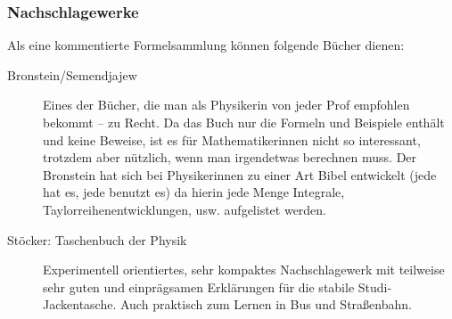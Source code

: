 \subsubsection{Nachschlagewerke}

Als eine kommentierte Formelsammlung können folgende Bücher dienen:

\begin{description}
\item[Bronstein/Semendjajew]{
		Eines der Bücher, die man als Physikerin von jeder Prof empfohlen bekommt -- zu Recht. Da das Buch nur die Formeln und Beispiele enthält und keine Beweise, ist es für Mathematikerinnen nicht so interessant, trotzdem aber nützlich, wenn man irgendetwas berechnen muss. Der Bronstein hat sich bei Physikerinnen zu einer Art Bibel entwickelt (jede hat es, jede benutzt es) da hierin jede Menge Integrale, Taylorreihenentwicklungen, usw. aufgelistet werden.}

\item[Stöcker: Taschenbuch der Physik]{
		Experimentell orientiertes, sehr kompaktes Nachschlagewerk mit teilweise sehr guten und einprägsamen Erklärungen für die stabile Studi- Jackentasche. Auch praktisch zum Lernen in Bus und Straßenbahn.}
\end{description}

\vfill
\eject